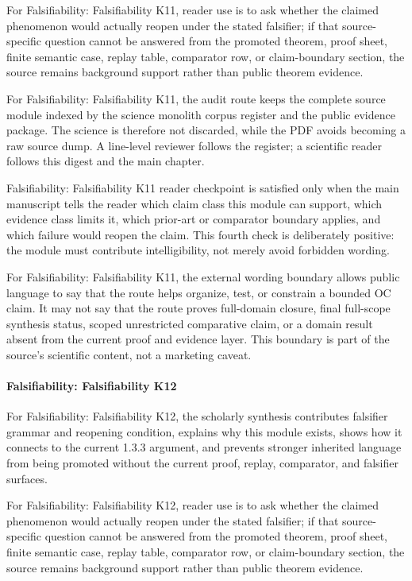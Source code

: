 For Falsifiability: Falsifiability K11, reader use is to ask whether the claimed phenomenon would actually reopen under the stated falsifier; if that source-specific question cannot be answered from the promoted theorem, proof sheet, finite semantic case, replay table, comparator row, or claim-boundary section, the source remains background support rather than public theorem evidence.


For Falsifiability: Falsifiability K11, the audit route keeps the complete source module indexed by the science monolith corpus register and the public evidence package. The science is therefore not discarded, while the PDF avoids becoming a raw source dump. A line-level reviewer follows the register; a scientific reader follows this digest and the main chapter.


Falsifiability: Falsifiability K11 reader checkpoint is satisfied only when the main manuscript tells the reader which claim class this module can support, which evidence class limits it, which prior-art or comparator boundary applies, and which failure would reopen the claim. This fourth check is deliberately positive: the module must contribute intelligibility, not merely avoid forbidden wording.


For Falsifiability: Falsifiability K11, the external wording boundary allows public language to say that the route helps organize, test, or constrain a bounded OC claim. It may not say that the route proves full-domain closure, final full-scope synthesis status, scoped unrestricted comparative claim, or a domain result absent from the current proof and evidence layer. This boundary is part of the source's scientific content, not a marketing caveat.


\paragraph{Falsifiability: Falsifiability K12}

For Falsifiability: Falsifiability K12, the scholarly synthesis contributes falsifier grammar and reopening condition, explains why this module exists, shows how it connects to the current 1.3.3 argument, and prevents stronger inherited language from being promoted without the current proof, replay, comparator, and falsifier surfaces.


For Falsifiability: Falsifiability K12, reader use is to ask whether the claimed phenomenon would actually reopen under the stated falsifier; if that source-specific question cannot be answered from the promoted theorem, proof sheet, finite semantic case, replay table, comparator row, or claim-boundary section, the source remains background support rather than public theorem evidence.


